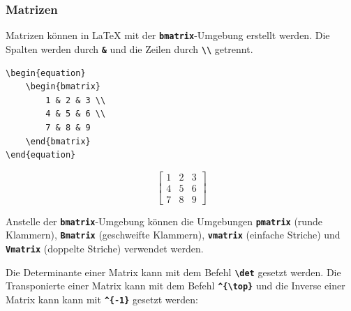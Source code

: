 \subsubsection{Matrizen}
Matrizen können in \LaTeX{} mit der \textbf{\texttt{bmatrix}}-Umgebung erstellt werden. Die Spalten werden durch \textbf{\texttt{\&}} und die Zeilen durch \textbf{\texttt{\textbackslash\textbackslash}} getrennt.

\begin{minipage}{0.5\textwidth}
    \begin{lstlisting}[language={[LaTeX]TeX}]
\begin{equation}
    \begin{bmatrix}
        1 & 2 & 3 \\
        4 & 5 & 6 \\
        7 & 8 & 9
    \end{bmatrix}
\end{equation}
\end{lstlisting}
\end{minipage}
\hfill
\begin{minipage}{0.5\textwidth}
    \begin{equation}
        \begin{bmatrix}
            1 & 2 & 3 \\
            4 & 5 & 6 \\
            7 & 8 & 9
        \end{bmatrix}
    \end{equation}
\end{minipage}

Anstelle der \textbf{\texttt{bmatrix}}-Umgebung können die Umgebungen \textbf{\texttt{pmatrix}} (runde Klammern), \textbf{\texttt{Bmatrix}} (geschweifte Klammern), \textbf{\texttt{vmatrix}} (einfache Striche) und \textbf{\texttt{Vmatrix}} (doppelte Striche) verwendet werden.

Die Determinante einer Matrix kann mit dem Befehl \textbf{\texttt{\textbackslash det}} gesetzt werden. Die Transponierte einer Matrix kann mit dem Befehl \textbf{\texttt{\textasciicircum\{\textbackslash top\}}} und die Inverse einer Matrix kann kann mit \textbf{\texttt{\textasciicircum\{-1\}}} gesetzt werden:

